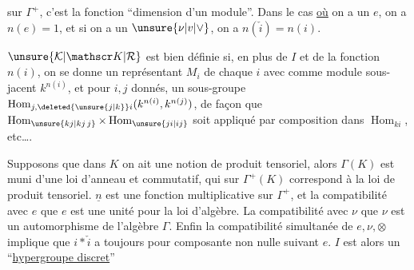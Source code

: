 sur $ {\Gamma}^+$, c'est la fonction ``dimension d'un
module''. Dans le cas \uline{où} on a un $e$,
on a $n(e)=1$, et si on a un $\unsure{\nu|v|\vee}$, on a
$n(\check i)=n(i)$.

$\unsure{\mathcal K|\mathscr K|\mathcal R}$ est bien définie si, en plus de
$I$ et de la fonction $n(i)$, on se donne un
représentant $M_i$ de chaque $i$ avec comme
module sous-jacent $k^{n(i)}$, et pour $i,j$ donnés,
un sous-groupe $\operatorname{Hom}_{j,\deleted{\unsure{j|k}}i}(k^{n(i)},k^{n(j)})$,
de façon que $\operatorname{Hom}_{\unsure{kj|kj\,j}}\times\operatorname{Hom}_{\unsure{ji|ij}}$ soit appliqué
par composition dans $\operatorname{Hom}_{ki}$, etc\ldots.

Supposons que dans $K$ on ait une
notion de produit tensoriel, alors
$\Gamma(K)$ est muni d'une loi d'anneau 
et commutatif, qui sur $\Gamma^+(K)$  correspond
à la loi de produit tensoriel. $\underline n$ est une
fonction multiplicative sur $\Gamma^+$, et la
compatibilité avec $e$   que $e$ est
une unité pour  la loi d'algèbre. La
compatibilité avec $\nu$   que $\nu$ est
un automorphisme de l'algèbre $\Gamma$. Enfin
la compatibilité simultanée de
$e,\nu,\otimes$ implique que $i*\check i$ a toujours
pour composante non nulle suivant $e$.
$I$ est alors un ``\uline{hypergroupe discret}''
